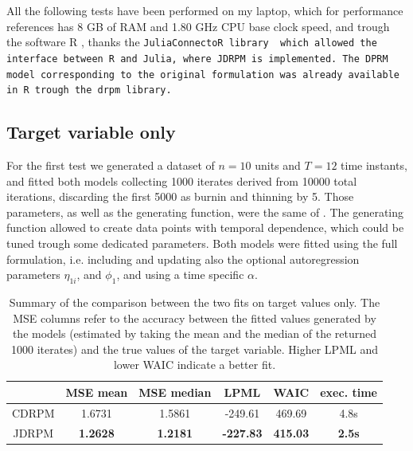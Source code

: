\documentclass[12pt,	%
	a4paper,		%
	twoside,		%
	openright,		%
	titlepage,%
	]{book}
\theoremstyle{definition}
\begin{document}
All the following tests have been performed on my laptop, which for performance references  has 8 GB of RAM and 1.80 GHz CPU base clock speed, and trough the software R \cite{R-cite}, thanks the \tt{JuliaConnectoR} library \cite{juliaconnectoR} which allowed the interface between R and Julia, where JDRPM is implemented. The DPRM model corresponding to the original formulation was already available in R trough the \tt{drpm} library.

\subsection{Target variable only}
\label{Target variable only}

For the first test we generated a dataset of $n=10$ units and $T=12$ time instants, and fitted both models collecting 1000 iterates derived from 10000 total iterations, discarding the first 5000 as burnin and thinning by 5. Those parameters, as well as the generating function, were the same of \cite{1-drpm}. The generating function allowed to create data points with temporal dependence, which could be tuned trough some dedicated parameters. Both models were fitted using the full formulation, i.e. including and updating also the optional autoregression parameters $\eta_{1i}$, and $\phi_1$, and using a time specific $\alpha$.


\begin{table}[!htb]
    \caption[Accuracy metrics of CDRPM and JDRPM fits, target values only]{Summary of the comparison between the two fits on target values only. The MSE columns refer to the accuracy between the fitted values generated by the models (estimated by taking the mean and the median of the returned 1000 iterates) and the true values of the target variable. Higher LPML and lower WAIC indicate a better fit.}
    \centering
    \begin{tabular}{cccccc}
    \toprule
           & MSE mean &  MSE median & LPML & WAIC & exec. time  \\
           \midrule
        CDRPM &  1.6731  & 1.5861  & -249.61 & 469.69 & 4.8s\\
        JDRPM & \textbf{1.2628}  & \textbf{1.2181}  & \textbf{-227.83} &  \textbf{415.03}  &  \textbf{2.5s} \\
        \bottomrule
    \end{tabular}
    \label{tab: fits metrics no space}
\end{table}
\end{document}
